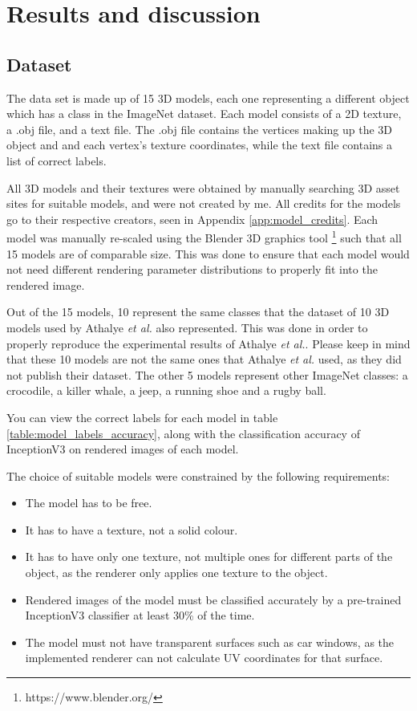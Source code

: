 \chapter{Results and discussion}
    \label{chap:results}

\section{Dataset}
    \label{sec:dataset}
    
The data set is made up of 15 3D models, each one representing a different object which has a class in the ImageNet dataset. Each model consists of a 2D texture, a .obj file, and a text file. The .obj file contains the vertices making up the 3D object and and each vertex's texture coordinates, while the text file contains a list of correct labels.

All 3D models and their textures were obtained by manually searching 3D asset sites for suitable models, and were not created by me. All credits for the models go to their respective creators, seen in Appendix \ref{app:model_credits}. Each model was manually re-scaled using the Blender 3D graphics tool \footnote{https://www.blender.org/} such that all 15 models are of comparable size. This was done to ensure that each model would not need different rendering parameter distributions to properly fit into the rendered image.

Out of the 15 models, 10 represent the same classes that the dataset of 10 3D models used by Athalye \textit{et al.} \cite{athalye} also represented. This was done in order to properly reproduce the experimental results of Athalye \textit{et al.}. Please keep in mind that these 10 models are not the same ones that Athalye \textit{et al.} used, as they did not publish their dataset. The other 5 models represent other ImageNet classes: a crocodile, a killer whale, a jeep, a running shoe and a rugby ball.

You can view the correct labels for each model in table \ref{table:model_labels_accuracy}, along with the classification accuracy of InceptionV3 on rendered images of each model.

The choice of suitable models were constrained by the following requirements:

\begin{itemize}
    \item The model has to be free.
    \item It has to have a texture, not a solid colour.
    \item It has to have only one texture, not multiple ones for different parts of the object, as the renderer only applies one texture to the object.
    \item Rendered images of the model must be classified accurately by a pre-trained InceptionV3 classifier at least 30\% of the time.
    \item The model must not have transparent surfaces such as car windows, as the implemented renderer can not calculate UV coordinates for that surface.
\end{itemize}

